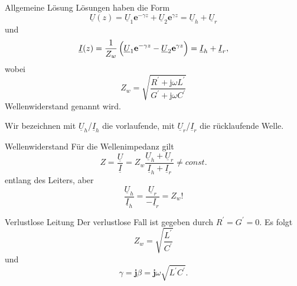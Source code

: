\documentclass{beamer}
\begin{document}
\begin{frame}{Allgemeine Lösung}
    Lösungen haben die Form
    \begin{equation}
        \underline{U}(z) = \underline{U}_{1} \mathbf{e}^{- \gamma z}
        +
        \underline{U}_{2} \mathbf{e}^{\gamma z}
        = \underline{U}_{h} + \underline{U}_{r} \label{eq:VerlustU}
    \end{equation}
    und
    \begin{equation}
        \underline{I}(z) = \frac{1}{Z_{w}} \left( \vphantom{\sqrt{1}{Z}}
        \underline{U}_{1} \mathbf{e}^{- \gamma z} - \underline{U}_{2} \mathbf{e}^{\gamma z} \right)
        = \underline{I}_{h} + \underline{I}_{r}, \label{eq:VerlustI}
    \end{equation}
    wobei
    \begin{equation}
        Z_{w} = \sqrt{\frac{R^{\prime} + \mathrm{j} \omega L^{\prime}}{G^{\prime} + \mathrm{j} \omega C^{\prime}}}
        \label{eq:Zw}
    \end{equation}
    Wellenwiderstand genannt wird.


    Wir bezeichnen mit $\underline{U}_{h}$/$\underline{I}_{h}$ die \alert{vorlaufende}, mit
    $\underline{U}_{r}$/$\underline{I}_{r}$ die \alert{rücklaufende} Welle.
\end{frame}


\begin{frame}{Wellenwiderstand}
Für die Wellenimpedanz gilt
\begin{equation*}
    Z = \frac{\underline{U}}{\underline{I}} =
     Z_{w} \frac{\underline{U}_{h} + \underline{U}_{r}}{\underline{I}_{h} + \underline{I}_{r}}
     \ne const.
\end{equation*}
entlang des Leiters, aber
\[ \frac{\underline{U}_{h}}{\underline{I}_{h}} = \frac{\underline{U}_{r}}{- \underline{I}_{r}} = Z_{w}! \]

\end{frame}



\begin{frame}{Verlustlose Leitung}
Der verlustlose Fall ist gegeben durch \mbox{$R^{\prime} = G^{\prime} = 0$}.
Es folgt
\[
Z_{w} = \sqrt{\frac{L^{\prime}}{C^{\prime}}}
\]
und
\[
\gamma = \mathbf{j} \beta = \mathbf{j} \omega \sqrt{L^{\prime} C^{\prime}}.
\]
\end{frame}
\end{document}
